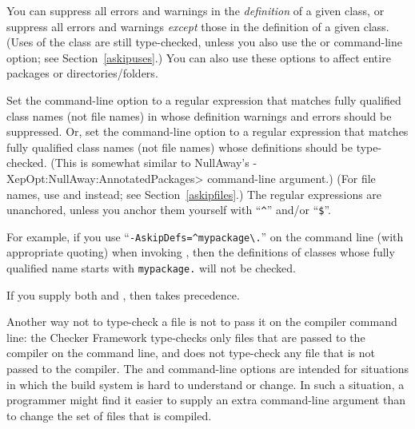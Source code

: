 


You can suppress all errors and warnings in the \emph{definition} of a given
class, or suppress all errors and warnings \emph{except} those in the definition
of a given class.  (Uses of the class are still type-checked, unless you also use
the  or  command-line option;
see Section~\ref{askipuses}.)
You can also use these options to affect entire packages or directories/folders.

Set the  command-line option to a
regular expression that matches fully qualified class names (not file names) in whose definition warnings and errors
should be suppressed.
Or, set the  command-line option to a
regular expression that matches fully qualified class names (not file names) whose
definitions should be type-checked.
(This is somewhat similar to NullAway's
\<-XepOpt:NullAway:AnnotatedPackages> command-line argument.)
(For file names, use  and  instead; see
Section~\ref{askipfiles}.)
The regular expressions are unanchored, unless you anchor them yourself
with ``\codesize\verb|^|'' and/or ``\codesize\verb|$|''.

For example, if you use
``{\codesize\verb|-AskipDefs=^mypackage\.|}'' on the command line
(with appropriate quoting) when invoking
, then the definitions of
classes whose fully qualified name starts with \codesize\verb|mypackage.|
will not be checked.

If you supply both  and , then
 takes precedence.

Another way not to type-check a file is not to pass it on the compiler
command line:  the Checker Framework type-checks only files that are passed
to the compiler on the command line, and does not type-check any file that
is not passed to the compiler.  The  and 
command-line options
are intended for situations in which the build system is hard to understand
or change.  In such a situation, a programmer might find it easier to supply
an extra command-line argument than to change the set of files that is
compiled.

